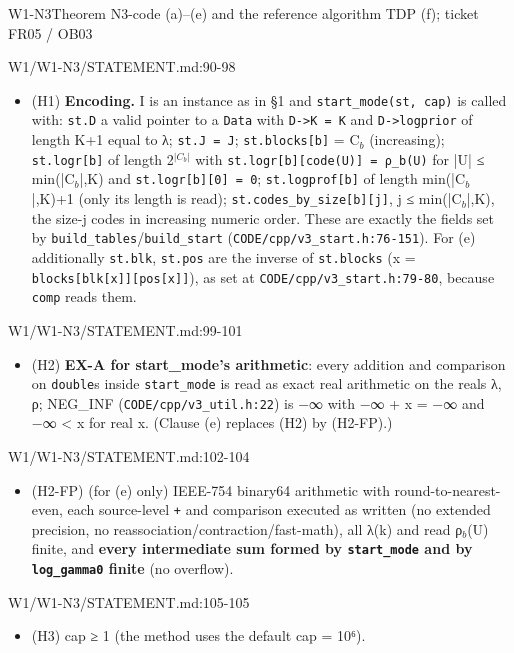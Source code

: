 \begin{card}{W1-N3}{Theorem N3-code (a)–(e) and the reference algorithm TDP (f); ticket FR05 / OB03}
\begin{stmt}{W1/W1-N3/STATEMENT.md:90-98}
\begin{itemize}
\item (H1) \textbf{Encoding.} I is an instance as in §1 and \texttt{start\_mode(st, cap)} is called with: \texttt{st.D} a valid pointer to a
\texttt{Data} with \texttt{D->K = K} and \texttt{D->logprior} of length K+1 equal to λ; \texttt{st.J = J}; \texttt{st.blocks[b]} = C$_{b}$ (increasing);
\texttt{st.logr[b]} of length 2$^{|C_b|}$ with \texttt{st.logr[b][code(U)] = ρ\_b(U)} for |U| ≤ min(|C$_{b}$|,K) and \texttt{st.logr[b][0] = 0};
\texttt{st.logprof[b]} of length min(|C$_{b}$|,K)+1 (only its length is read); \texttt{st.codes\_by\_size[b][j]}, j ≤ min(|C$_{b}$|,K), the
size-j codes in increasing numeric order. These are exactly the fields set by \texttt{build\_tables}/\texttt{build\_start}
(\texttt{CODE/cpp/v3\_start.h:76-151}). For (e) additionally \texttt{st.blk}, \texttt{st.pos} are the inverse of \texttt{st.blocks}
(x = \texttt{blocks[blk[x]][pos[x]]}), as set at \texttt{CODE/cpp/v3\_start.h:79-80}, because \texttt{comp} reads them.
\end{itemize}
\end{stmt}
\begin{stmt}{W1/W1-N3/STATEMENT.md:99-101}
\begin{itemize}
\item (H2) \textbf{EX-A for start\_mode's arithmetic}: every addition and comparison on \texttt{double}s inside \texttt{start\_mode} is read as
exact real arithmetic on the reals λ, ρ; NEG\_INF (\texttt{CODE/cpp/v3\_util.h:22}) is −∞ with −∞ + x = −∞ and −∞ < x for real x.
(Clause (e) replaces (H2) by (H2-FP).)
\end{itemize}
\end{stmt}
\begin{stmt}{W1/W1-N3/STATEMENT.md:102-104}
\begin{itemize}
\item (H2-FP) (for (e) only) IEEE-754 binary64 arithmetic with round-to-nearest-even, each source-level \texttt{+} and comparison
executed as written (no extended precision, no reassociation/contraction/fast-math), all λ(k) and read ρ$_{b}$(U)
finite, and \textbf{every intermediate sum formed by \texttt{start\_mode} and by \texttt{log\_gamma0} finite} (no overflow).
\end{itemize}
\end{stmt}
\begin{stmt}{W1/W1-N3/STATEMENT.md:105-105}
\begin{itemize}
\item (H3) cap ≥ 1 (the method uses the default cap = 10⁶).

\end{itemize}
\end{stmt}
\end{card}
